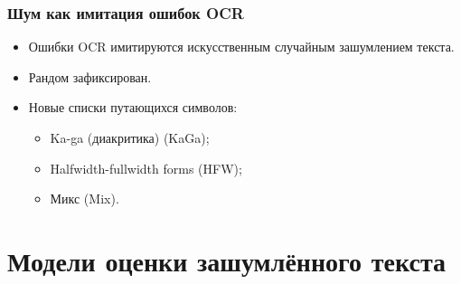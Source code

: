 \documentclass[14pt]{beamer}
\begin{document}
\begin{frame}
	\frametitle{Шум как имитация ошибок OCR}
	
	\begin{itemize}
		\item Ошибки OCR имитируются искусственным случайным зашумлением текста.
		\item Рандом зафиксирован.
		\item Новые списки путающихся символов:
		
		\begin{itemize} 	
			\item Ka-ga (диакритика) (KaGa);
			\begin{figure}[h]
			\end{figure}
			\item Halfwidth-fullwidth forms (HFW);
			\begin{figure}[h]
			\end{figure}
			\item Микс (Mix).
		\end{itemize}
	\end{itemize}
\end{frame}

\section{Модели оценки зашумлённого текста}
\end{document}
